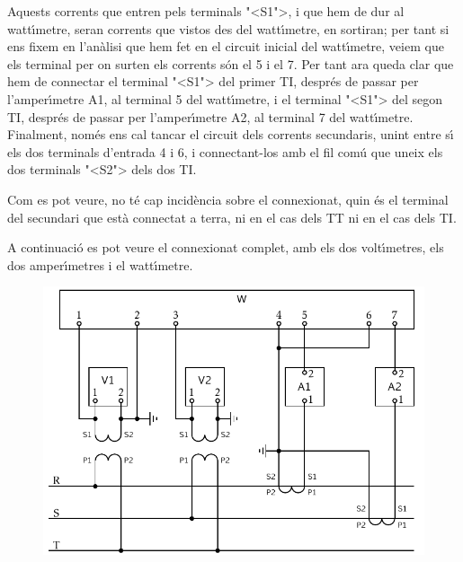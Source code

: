 \begin{exemple}
Aquests corrents que entren pels terminals {"<}\textsf{S1}{">}, i que hem de dur al
watt\'{\i}metre, seran corrents que vistos des del watt\'{\i}metre, en
sortiran; per tant si ens fixem en l'an\`{a}lisi que hem fet en el
circuit inicial del watt\'{\i}metre, veiem que els terminal per on surten
els corrents s\'{o}n el 5 i el 7. Per tant ara queda clar que hem de
connectar el terminal {"<}\textsf{S1}{">} del primer TI, despr\'{e}s de passar per
l'amper\'{\i}metre \textsf{A1}, al terminal 5 del watt\'{\i}metre, i el
terminal {"<}\textsf{S1}{">} del segon TI, despr\'{e}s de passar per l'amper\'{\i}metre
\textsf{A2}, al terminal 7 del watt\'{\i}metre. Finalment, nom\'{e}s ens cal
tancar el circuit dels corrents secundaris, unint entre s\'{\i} els dos
terminals d'entrada 4  i 6, i connectant-los amb el fil com\'{u} que
uneix els dos terminals {"<}\textsf{S2}{">} dels dos TI.

Com es pot veure, no t\'{e} cap incid\`{e}ncia sobre el connexionat, quin \'{e}s
el terminal del secundari que est\`{a} connectat a terra, ni en el cas
dels TT ni en el cas dels TI.

A continuaci\'{o} es pot veure el connexionat complet, amb els dos
volt\'{\i}metres, els dos amper\'{\i}metres i el watt\'{\i}metre.

\begin{figure}[h]
\centering
    \includegraphics{Imatges/Cap-TrafosMesProt-Instal-Watt.pdf}
\end{figure}

\end{exemple}
